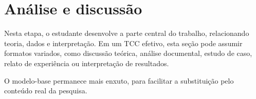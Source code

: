 
\chapter{Análise e discussão}

Nesta etapa, o estudante desenvolve a parte central do trabalho, relacionando teoria, dados e interpretação. Em um TCC efetivo, esta seção pode assumir formatos variados, como discussão teórica, análise documental, estudo de caso, relato de experiência ou interpretação de resultados.

O modelo-base permanece mais enxuto, para facilitar a substituição pelo conteúdo real da pesquisa.
